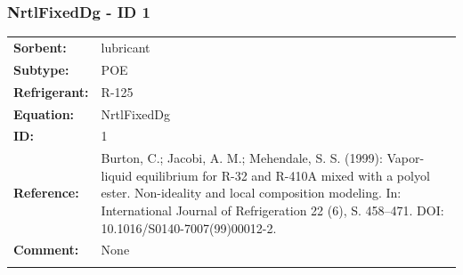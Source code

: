 \subsubsection{NrtlFixedDg - ID 1}
%
\begin{tabular}[l]{|lp{11.5cm}|}
\hline
\addlinespace

\textbf{Sorbent:} & lubricant \\
\textbf{Subtype:} & POE \\
\textbf{Refrigerant:} & R-125 \\
\textbf{Equation:} & NrtlFixedDg \\
\textbf{ID:} & 1 \\
\textbf{Reference:} & Burton, C.; Jacobi, A. M.; Mehendale, S. S. (1999): Vapor-liquid equilibrium for R-32 and R-410A mixed with a polyol ester. Non-ideality and local composition modeling. In: International Journal of Refrigeration 22 (6), S. 458–471. DOI: 10.1016/S0140-7007(99)00012-2. \\
\textbf{Comment:} & None \\

\addlinespace
\hline
\end{tabular}
\newline

